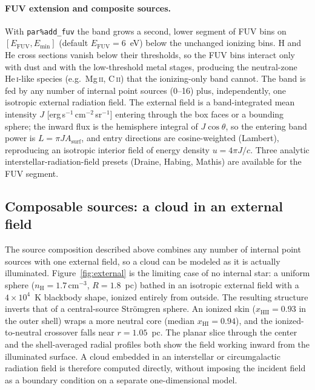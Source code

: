 \documentclass[twocolumn,linenumbers]{aastex702}
\newcommand{\code}[1]{\texttt{#1}}
\newcommand{\HeI}{He\,\textsc{i}}
\newcommand{\nH}{n_{\mathrm{H}}}
\newcommand{\xHI}{x_{\mathrm{HI}}}
\begin{document}
\paragraph{FUV extension and composite sources.}  With \code{par\%add\_fuv}
the band grows a second, lower segment of FUV bins on
$[E_{\mathrm{FUV}}, E_{\min}]$ (default $E_{\mathrm{FUV}} = 6$~eV) below
the unchanged ionizing bins.  H and He cross sections vanish below their
thresholds, so the FUV bins interact only with dust and with the
low-threshold metal stages, producing the neutral-zone \HeI-like species
(e.g.\ Mg\,\textsc{ii}, C\,\textsc{ii}) that the ionizing-only band
cannot.  The band is fed by any number of internal point sources
(0--16) plus, independently, one isotropic external radiation field.  The
external field is a band-integrated mean intensity $J$
[erg\,s$^{-1}$\,cm$^{-2}$\,sr$^{-1}$] entering through
the box faces or a bounding sphere; the inward flux is the hemisphere
integral of $J\cos\theta$, so the entering band power is $L = \pi J
A_{\mathrm{surf}}$, and entry directions are cosine-weighted (Lambert),
reproducing an isotropic interior field of energy density $u = 4\pi
J/c$.  Three analytic interstellar-radiation-field presets (Draine,
Habing, Mathis) are available for the FUV segment.

\subsection{Composable sources: a cloud in an external field}
\label{sec:external}

The source composition described above combines any number of internal point
sources with one external field, so a cloud can be modeled as it is actually
illuminated.  Figure~\ref{fig:external} is the limiting case of no internal
star: a uniform sphere ($\nH = 1.7\,\mathrm{cm^{-3}}$, $R = 1.8$~pc) bathed
in an isotropic external field with a $4\times10^4$~K blackbody shape,
ionized entirely from outside.  The resulting structure inverts that of a
central-source Str\"omgren sphere.  An ionized skin
($x_{\mathrm{HII}} = 0.93$ in the outer shell) wraps a more neutral core
(median $\xHI = 0.94$), and the ionized-to-neutral crossover falls near
$r = 1.05$~pc.  The planar slice through the center and the shell-averaged
radial profiles both show the field working inward from the illuminated
surface.  A cloud embedded in an interstellar or circumgalactic radiation
field is therefore computed directly, without imposing the incident field as
a boundary condition on a separate one-dimensional model.
\end{document}

